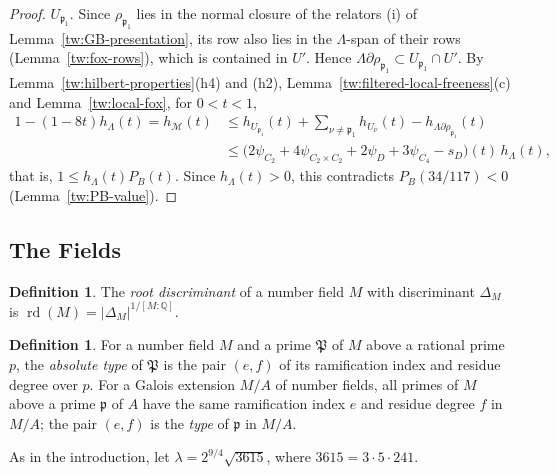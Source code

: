\documentclass[11pt]{amsart}
\numberwithin{equation}{section}
\theoremstyle{definition}
\newtheorem{definition}[equation]{Definition}
\theoremstyle{remark}
\DeclareMathOperator{\rd}{rd}
\newcommand{\Q}{\mathbb Q}
\begin{document}
\begin{proof}
$U_{\mathfrak p_1}$. Since $\rho_{\mathfrak p_1}$ lies in the normal closure of
the relators (i) of Lemma~\ref{tw:GB-presentation}, its row also lies in the
$\Lambda$-span of their rows (Lemma~\ref{tw:fox-rows}), which is contained in
$U'$. Hence $\Lambda\partial\rho_{\mathfrak p_1}\subset U_{\mathfrak p_1}\cap U'$.
By Lemma~\ref{tw:hilbert-properties}(h4) and (h2),
Lemma~\ref{tw:filtered-local-freeness}(c) and Lemma~\ref{tw:local-fox}, for
$0<t<1$,
\begin{align*}
 1-(1-8t)h_\Lambda(t)=h_{\mathcal M}(t)
 &\le h_{U_{\mathfrak p_1}}(t)+\sum_{\nu\ne\mathfrak p_1}h_{U_\nu}(t)
 -h_{\Lambda\partial\rho_{\mathfrak p_1}}(t)\\
 &\le\bigl(2\psi_{C_2}+4\psi_{C_2\times C_2}+2\psi_D+3\psi_{C_4}-s_D\bigr)(t)
 \,h_\Lambda(t),
\end{align*}
that is, $1\le h_\Lambda(t)P_B(t)$. Since $h_\Lambda(t)>0$, this contradicts
$P_B(34/117)<0$ (Lemma~\ref{tw:PB-value}).
\end{proof}

\subsection{The Fields}\label{tw:fields-section}

\begin{definition}\label{tw:rd}
The \emph{root discriminant} of a number field $M$ with discriminant
$\Delta_M$ is $\rd(M)=|\Delta_M|^{1/[M:\Q]}$.
\end{definition}

\begin{definition}\label{tw:type}
For a number field $M$ and a prime $\mathfrak P$ of $M$ above a rational
prime $p$, the \emph{absolute type} of $\mathfrak P$ is the pair $(e,f)$ of
its ramification index and residue degree over $p$. For a Galois extension
$M/A$ of number fields, all primes of $M$ above a prime $\mathfrak p$ of $A$
have the same ramification index $e$ and residue degree $f$ in $M/A$; the
pair $(e,f)$ is the \emph{type} of $\mathfrak p$ in $M/A$.
\end{definition}

As in the introduction, let $\lambda=2^{9/4}\sqrt{3615}$, where
$3615=3\cdot5\cdot241$.
\end{document}
